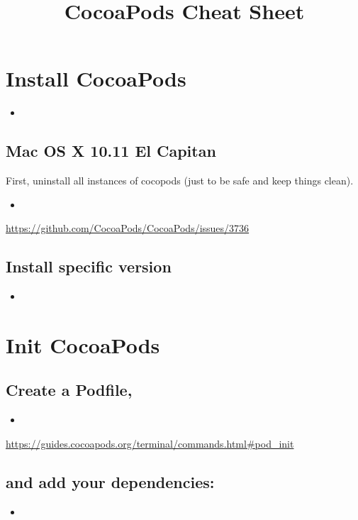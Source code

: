 \documentclass[a4paper, twocolumn]{article}
\title{CocoaPods Cheat Sheet}
\newcommand{\insertcode}[2]{\begin{itemize}\item[]\end{itemize}} %
\newcommand{\insertshellcode}[2]{\begin{itemize}\item[]\end{itemize}} %
\begin{document}
\maketitle
\section{Install CocoaPods}
\insertshellcode{"Scripts/installCocoaPods.txt"}{} %
\subsection{Mac OS X 10.11 El Capitan}
First, uninstall all instances of cocopods (just to be safe and keep things clean).
\insertshellcode{"Scripts/installCocoaPodsElCapitan.txt"}{} %
\url{https://github.com/CocoaPods/CocoaPods/issues/3736}

\subsection{Install specific version}
\insertshellcode{"Scripts/installCocoaPodsVersion.txt"}{} %

\section{Init CocoaPods}
\subsection{Create a Podfile,}
\insertshellcode{"Scripts/createPodfile.txt"}{} %
\url{https://guides.cocoapods.org/terminal/commands.html#pod_init}
\subsection{and add your dependencies:}
\insertcode{"Scripts/Podfile"}{}
\end{document}
